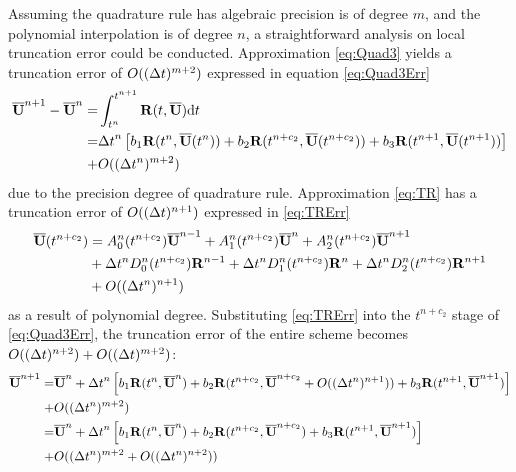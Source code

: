 \documentclass[preprint,12pt]{elsarticle}
\begin{document}
Assuming the quadrature rule has algebraic precision is
of degree $m$, and the polynomial interpolation is of degree $n$,
a straightforward analysis on local truncation error could be conducted.
Approximation \eqref{eq:Quad3} yields a
truncation error of $O((\mathrm\Delta t)^{m+2} )$ expressed in equation \eqref{eq:Quad3Err}
\begin{equation}
    \label{eq:Quad3Err}
    \begin{aligned}
        \overline{\mathbf{U}}^{n+1} - \overline{\mathbf{U}}^{n} = & \int_{t^n}^{t^{n+1}}{
        \mathbf{R}(t, \overline{\mathbf{U}})\dd t}                              \\  = &
        {\mathrm\Delta t}^{n}
        \left[
            b_1\mathbf{R}(t^n, \overline{\mathbf{U}}(t^n))
            +
            b_2\mathbf{R}(t^{n+c_2}, \overline{\mathbf{U}}(t^{n+c_2}))
            +
            b_3\mathbf{R}(t^{n+1}, \overline{\mathbf{U}}(t^{n+1}))
            \right]
        \\ + &
        O((\mathrm\Delta t^{n})^{m+2} )
    \end{aligned}
\end{equation}
due to the precision degree of quadrature rule.
Approximation
\eqref{eq:TR} has a truncation error of $O((\mathrm\Delta t)^{n+1})$
expressed in \eqref{eq:TRErr}
\begin{equation}
    \begin{aligned}
        \label{eq:TRErr}
        \overline{\mathbf{U}}(t^{n+c_2}) & =
        A^n_0(t^{n+c_2})\overline{\mathbf{U}}^{n - 1} +
        A^n_1(t^{n+c_2})\overline{\mathbf{U}}^{n} +
        A^n_2(t^{n+c_2})\overline{\mathbf{U}}^{n + 1}
        \\ & +
        \mathrm\Delta t^n D^n_0(t^{n+c_2})\mathbf{R}^{n - 1} +
        \mathrm\Delta t^n D^n_1(t^{n+c_2})\mathbf{R}^{n} +
        \mathrm\Delta t^n D^n_2(t^{n+c_2})\mathbf{R}^{n + 1}
        \\ & +
        O((\mathrm\Delta t^{n})^{n+1} )
    \end{aligned}
\end{equation}
as a result of polynomial degree.
Substituting \eqref{eq:TRErr} into the $t^{n+c_2}$ stage
of \eqref{eq:Quad3Err}, the truncation error
of the entire scheme becomes $O((\mathrm\Delta t)^{n+2}) + O((\mathrm\Delta t)^{m+2})$:
\begin{equation}
    \begin{aligned}
        \overline{\mathbf{U}}^{n+1} = & \overline{\mathbf{U}}^{n} + {\mathrm\Delta t}^{n}
        \left[
            b_1\mathbf{R}(t^n, \overline{\mathbf{U}}^n)
            +
            b_2\mathbf{R}(t^{n+c_2}, \overline{\mathbf{U}}^{n+c_2} + O((\mathrm\Delta t^{n})^{n+1} ))
            +
            b_3\mathbf{R}(t^{n+1}, \overline{\mathbf{U}}^{n+1})
            \right]
        \\ + &
        O((\mathrm\Delta t^{n})^{m+2} )               \\
        =           &
        \overline{\mathbf{U}}^{n} + {\mathrm\Delta t}^{n}
        \left[
            b_1\mathbf{R}(t^n, \overline{\mathbf{U}}^n)
            +
            b_2\mathbf{R}(t^{n+c_2}, \overline{\mathbf{U}}^{n+c_2})
            +
            b_3\mathbf{R}(t^{n+1}, \overline{\mathbf{U}}^{n+1})
            \right]
        \\ + &
        O((\mathrm\Delta t^{n})^{m+2}  + O((\mathrm\Delta t^{n})^{n+2} ))
    \end{aligned}
    \label{eq:fullLTE}
\end{equation}
\end{document}
